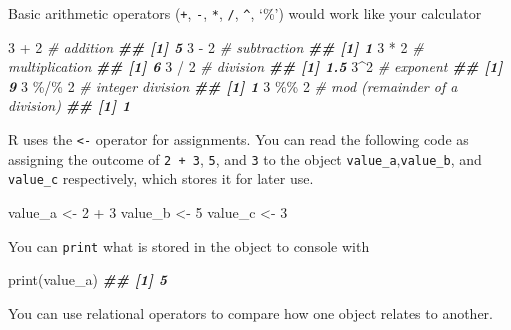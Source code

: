 \documentclass[
]{book}
\newenvironment{Shaded}{\begin{snugshade}}{\end{snugshade}}
\newcommand{\CommentTok}[1]{\textcolor[rgb]{0.56,0.35,0.01}{\textit{#1}}}
\newcommand{\DecValTok}[1]{\textcolor[rgb]{0.00,0.00,0.81}{#1}}
\newcommand{\DocumentationTok}[1]{\textcolor[rgb]{0.56,0.35,0.01}{\textbf{\textit{#1}}}}
\newcommand{\FunctionTok}[1]{\textcolor[rgb]{0.00,0.00,0.00}{#1}}
\newcommand{\NormalTok}[1]{#1}
\newcommand{\OtherTok}[1]{\textcolor[rgb]{0.56,0.35,0.01}{#1}}
\newcommand{\SpecialCharTok}[1]{\textcolor[rgb]{0.00,0.00,0.00}{#1}}
\begin{document}
Basic arithmetic operators (\texttt{+}, \texttt{-}, \texttt{*}, \texttt{/}, \texttt{\^{}}, `\%') would work like your calculator

\begin{Shaded}
\begin{Highlighting}[]
\DecValTok{3} \SpecialCharTok{+} \DecValTok{2} \CommentTok{\# addition}
\DocumentationTok{\#\# [1] 5}
\DecValTok{3} \SpecialCharTok{{-}} \DecValTok{2} \CommentTok{\# subtraction}
\DocumentationTok{\#\# [1] 1}
\DecValTok{3} \SpecialCharTok{*} \DecValTok{2} \CommentTok{\# multiplication}
\DocumentationTok{\#\# [1] 6}
\DecValTok{3} \SpecialCharTok{/} \DecValTok{2} \CommentTok{\# division}
\DocumentationTok{\#\# [1] 1.5}
\DecValTok{3}\SpecialCharTok{\^{}}\DecValTok{2} \CommentTok{\# exponent}
\DocumentationTok{\#\# [1] 9}
\DecValTok{3} \SpecialCharTok{\%/\%} \DecValTok{2} \CommentTok{\# integer division}
\DocumentationTok{\#\# [1] 1}
\DecValTok{3} \SpecialCharTok{\%\%} \DecValTok{2} \CommentTok{\# mod (remainder of a division)}
\DocumentationTok{\#\# [1] 1}
\end{Highlighting}
\end{Shaded}

R uses the \texttt{\textless{}-} operator for assignments. You can read the following code as assigning the outcome of \texttt{2\ +\ 3}, \texttt{5}, and \texttt{3} to the object \texttt{value\_a},\texttt{value\_b}, and \texttt{value\_c} respectively, which stores it for later use.

\begin{Shaded}
\begin{Highlighting}[]
\NormalTok{value\_a }\OtherTok{\textless{}{-}} \DecValTok{2} \SpecialCharTok{+} \DecValTok{3}
\NormalTok{value\_b }\OtherTok{\textless{}{-}} \DecValTok{5}
\NormalTok{value\_c }\OtherTok{\textless{}{-}} \DecValTok{3}
\end{Highlighting}
\end{Shaded}

You can \texttt{print} what is stored in the object to console with

\begin{Shaded}
\begin{Highlighting}[]
\FunctionTok{print}\NormalTok{(value\_a)}
\DocumentationTok{\#\# [1] 5}
\end{Highlighting}
\end{Shaded}

You can use relational operators to compare how one object relates to another.
\end{document}
